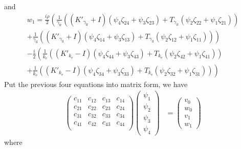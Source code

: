 and
\begin{multline*}
  w_1 = \frac{i \rho}{2} \left(\frac{1}{\gamma_\text{ir}}\left((K'_{\gamma_\text{ir}} + I)(\psi_4 \zeta_{24}+\psi_3 \zeta_{23}) +T_{\gamma_\text{ir}} (\psi_2 \zeta_{22}+\psi_1 \zeta_{21})\right)\right.\\
  \left.+\frac{1}{\gamma_\text{il}}\left((K'_{\gamma_\text{il}} + I)(\psi_4 \zeta_{14}+\psi_3 \zeta_{13}) +T_{\gamma_\text{il}} (\psi_2 \zeta_{12}+\psi_1 \zeta_{11})\right)\right)\\
  -\frac{i}{2}\left(\frac{1}{k_\text{e}}\left((K'_{k_\text{e}}-I)(\psi_4 \zeta_{44}+\psi_3 \zeta_{43}) +T_{k_\text{e}} (\psi_2 \zeta_{42}+\psi_1 \zeta_{41})\right)\right.\\
  \left.+\frac{1}{k_\text{e}}\left((K'_{k_\text{e}}-I)(\psi_4 \zeta_{34}+\psi_3 \zeta_{33}) +T_{k_\text{e}} (\psi_2 \zeta_{32}+\psi_1 \zeta_{31})\right)\right)
\end{multline*}
Put the previous four equations into matrix form, we have
\begin{align*}
  \begin{pmatrix}
    c_{11} & c_{12} & c_{13} & c_{14} \\
    c_{21} & c_{22} & c_{23} & c_{24} \\
    c_{31} & c_{32} & c_{33} & c_{34} \\
    c_{41} & c_{42} & c_{43} & c_{44} \\
  \end{pmatrix} 
  \begin{pmatrix}
    \psi_1 \\ \psi_2 \\ \psi_3 \\ \psi_4
  \end{pmatrix} &=
  \begin{pmatrix}
    v_0 \\ w_0 \\ v_1 \\ w_1
  \end{pmatrix}
\end{align*}
where
